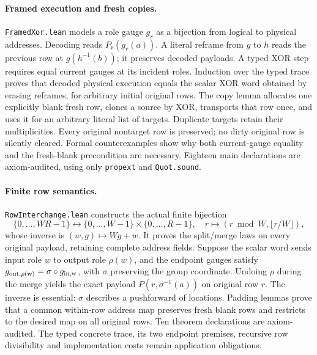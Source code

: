 \documentclass[11pt]{article}
\begin{document}
\paragraph{Framed execution and fresh copies.}
\texttt{FramedXor.lean} models a role gauge $g_r$ as a bijection from
logical to physical addresses. Decoding reads $P_r(g_r(a))$.
A literal reframe from $g$ to $h$ reads the previous row at
$g(h^{-1}(b))$; it preserves decoded payloads. A typed XOR step requires
equal current gauges at its incident roles. Induction over the typed
trace proves that decoded physical execution equals the scalar XOR word
obtained by erasing reframes, for arbitrary initial original rows.
The copy lemma allocates one explicitly blank fresh row, clones a source
by XOR, transports that row once, and uses it for an arbitrary literal
list of targets. Duplicate targets retain their multiplicities. Every
original nontarget row is preserved; no dirty original row is silently
cleared. Formal counterexamples show why both current-gauge equality and
the fresh-blank precondition are necessary. Eighteen main declarations
are axiom-audited, using only \texttt{propext} and \texttt{Quot.sound}.

\paragraph{Finite row semantics.}
\texttt{RowInterchange.lean} constructs the actual finite bijection
\[
 \{0,\ldots,WR-1\}\longleftrightarrow
 \{0,\ldots,W-1\}\times\{0,\ldots,R-1\},\quad
 r\longmapsto(r\bmod W,\lfloor r/W\rfloor),
\]
whose inverse is $(w,g)\mapsto Wg+w$. It proves the split/merge laws on
every original payload, retaining complete address fields.
Suppose the scalar word sends input role $w$ to output role $\rho(w)$,
and the endpoint gauges satisfy
$g_{\rm out,\rho(w)}=\sigma\circ g_{\rm in,w}$, with $\sigma$ preserving
the group coordinate. Undoing $\rho$ during the merge yields the exact
payload $P(r,\sigma^{-1}(a))$ on original row $r$.
The inverse is essential: $\sigma$ describes a pushforward of locations.
Padding lemmas prove that a common within-row address map preserves fresh
blank rows and restricts to the desired map on all original rows.
Ten theorem declarations are axiom-audited. The typed concrete trace,
its two endpoint premises, recursive row divisibility and implementation
costs remain application obligations.
\end{document}
